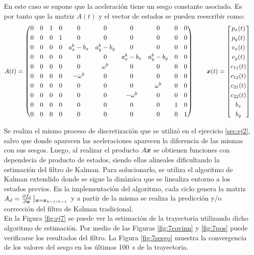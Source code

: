 
En este caso se supone que la aceleración tiene un sesgo constante asociado. Es por tanto que la matriz $A(t)$ y el vector de estados se pueden reescribir como:
		\begin{equation*}
		A(t) = \begin{pmatrix}0&0&1&0&0&0&0&0&0&0\\[0.3em]0&0&0&1&0&0&0&0&0&0\\[0.3em]0&0&0&0&a^b_x - b_x&a^b_y - b_y&0&0&0&0\\[0.3em]0&0&0&0&0&0&a^b_x -b_x&a^b_y - b_y&0&0\\[0.3em]0&0&0&0&0&\omega^b&0&0&0&0\\[0.3em]0&0&0&0&-\omega^b&0&0&0&0&0\\[0.3em]0&0&0&0&0&0&0&\omega^b&0&0\\[0.3em]0&0&0&0&0&0&-\omega^b&0&0&0\\[0.3em]0&0&0&0&0&0&0&0&1&0\\[0.3em] 0&0&0&0&0&0&0&0&0&1\end{pmatrix} \qquad%
			\vect{x}(t) = \begin{bmatrix} {p_x}(t) \\[0.3em] p_y(t) \\[0.3em] {v_x}(t) \\[0.3em] v_y(t) \\[0.3em] c_{11}(t) \\[0.3em] c_{12}(t) \\[0.3em] c_{21}(t) \\[0.3em] c_{22}(t) \\[0.3em] b_x \\[0.3em] b_y \end{bmatrix}
		\end{equation*}

	Se realiza el mismo proceso de discretización que se utilizó en el ejercicio \ref{sec:ej2}, salvo que donde aparecen las aceleraciones aparecen la diferencia de las mismas con sus sesgos. Luego, al realizar el producto $A\boldsymbol{x}$ se obtienen funciones con dependecia de producto de estados, siendo ellas alineales dificultando la estimación del filtro de Kalman. Para solucionarlo, se utiliza el algoritmo de Kalman extendido donde se sigue la dinámica que se linealiza entorno a los estados previos. En la implementación del algoritmo, cada ciclo genera la matriz $A_d = \frac{\partial{f_d}}{\partial \boldsymbol{x}}\left| _{\boldsymbol{x}=\boldsymbol{x}_{k-1/k-1}}\right. $ y a partir de la misma se realiza la predicción y/o corrección del filtro de Kalman tradicional.\\
	\indent En la Figura \ref{fig:ej7} se puede ver la estimación de la trayectoria utilizando dicho algoritmo de estimación. Por medio de las Figuras \ref{fig:7covinn} y \ref{fig:7pos} puede verificarse los resultados del filtro. La Figura \ref{fig:7sesgo} muestra la convergencia de los valores del sesgo en los últimos \SI{100}{\s} de la trayectoria.


